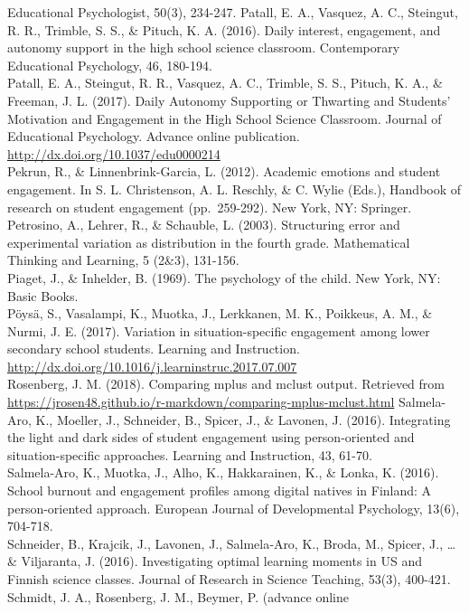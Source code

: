 \documentclass[]{book}
\theoremstyle{definition}
\theoremstyle{definition}
\theoremstyle{definition}
\theoremstyle{remark}
\begin{document}
Educational Psychologist, 50(3), 234-247. Patall, E. A., Vasquez, A. C.,
Steingut, R. R., Trimble, S. S., \& Pituch, K. A. (2016). Daily
interest, engagement, and autonomy support in the high school science
classroom. Contemporary Educational Psychology, 46, 180-194.\\
Patall, E. A., Steingut, R. R., Vasquez, A. C., Trimble, S. S., Pituch,
K. A., \& Freeman, J. L. (2017). Daily Autonomy Supporting or Thwarting
and Students' Motivation and Engagement in the High School Science
Classroom. Journal of Educational Psychology. Advance online
publication. \url{http://dx.doi.org/10.1037/edu0000214}\\
Pekrun, R., \& Linnenbrink-Garcia, L. (2012). Academic emotions and
student engagement. In S. L. Christenson, A. L. Reschly, \& C. Wylie
(Eds.), Handbook of research on student engagement (pp.~259-292). New
York, NY: Springer. Petrosino, A., Lehrer, R., \& Schauble, L. (2003).
Structuring error and experimental variation as distribution in the
fourth grade. Mathematical Thinking and Learning, 5 (2\&3), 131-156.\\
Piaget, J., \& Inhelder, B. (1969). The psychology of the child. New
York, NY: Basic Books.\\
Pöysä, S., Vasalampi, K., Muotka, J., Lerkkanen, M. K., Poikkeus, A. M.,
\& Nurmi, J. E. (2017). Variation in situation-specific engagement among
lower secondary school students. Learning and Instruction.
\url{http://dx.doi.org/10.1016/j.learninstruc.2017.07.007}\\
Rosenberg, J. M. (2018). Comparing mplus and mclust output. Retrieved
from
\url{https://jrosen48.github.io/r-markdown/comparing-mplus-mclust.html}
Salmela-Aro, K., Moeller, J., Schneider, B., Spicer, J., \& Lavonen, J.
(2016). Integrating the light and dark sides of student engagement using
person-oriented and situation-specific approaches. Learning and
Instruction, 43, 61-70.\\
Salmela-Aro, K., Muotka, J., Alho, K., Hakkarainen, K., \& Lonka, K.
(2016). School burnout and engagement profiles among digital natives in
Finland: A person-oriented approach. European Journal of Developmental
Psychology, 13(6), 704-718.\\
Schneider, B., Krajcik, J., Lavonen, J., Salmela‐Aro, K., Broda, M.,
Spicer, J., \ldots{} \& Viljaranta, J. (2016). Investigating optimal
learning moments in US and Finnish science classes. Journal of Research
in Science Teaching, 53(3), 400-421.\\
Schmidt, J. A., Rosenberg, J. M., Beymer, P. (advance online
\end{document}
